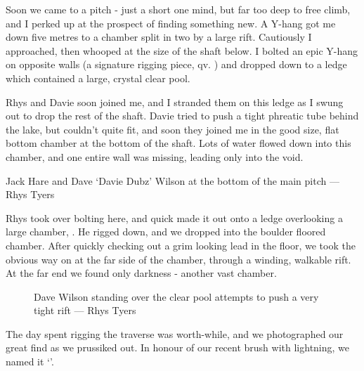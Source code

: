 Soon we came to a pitch - just a short one mind, but far too deep to free climb, and I perked up at the prospect of finding something new. A Y-hang got me down five metres to a chamber split in two by a large rift. Cautiously I approached, then whooped at the size of the shaft below. I bolted an epic Y-hang on opposite walls (a signature rigging piece, qv. ) and dropped down to a ledge which contained a large, crystal clear pool.

Rhys and Davie soon joined me, and I stranded them on this ledge as I swung out to drop the rest of the shaft. Davie tried to push a tight phreatic tube behind the lake, but couldn't quite fit, and soon they joined me in the good size, flat bottom chamber at the bottom of the shaft. Lots of water flowed down into this chamber, and one entire wall was missing, leading only into the void.


\begin{marginfigure}
\checkoddpage \ifoddpage \forcerectofloat \else \forceversofloat \fi
\centering
{}
\caption{Jack Hare and Dave `Davie Dubz' Wilson at the bottom of the \protect{} main pitch --- Rhys Tyers}
\label{Crystal pool}
\end{marginfigure}

Rhys took over bolting here, and quick made it out onto a ledge overlooking a large chamber, . He rigged down, and we dropped into the boulder floored chamber. After quickly checking out a grim looking lead in the floor, we took the obvious way on at the far side of the chamber, through a winding, walkable rift. At the far end we found only darkness - another vast chamber.

\begin{figure}[t!]
\checkoddpage \ifoddpage \forcerectofloat \else \forceversofloat \fi
\centering
{}
\caption{Dave Wilson standing over the clear pool attempts to push a very tight rift --- Rhys Tyers}
\end{figure}

The day spent rigging the traverse was worth-while, and we photographed our great find as we prussiked out. In honour of our recent brush with lightning, we named it `'. 



